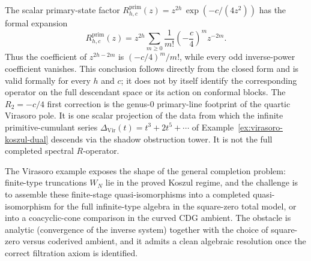 \begin{remark}
\label{rem:virasoro-r-matrix-paths}
The scalar primary-state factor
$R^{\mathrm{prim}}_{h,c}(z)=z^{2h}\,\exp(-c/(4z^{2}))$
has the formal expansion
\[
 R^{\mathrm{prim}}_{h,c}(z)
 =z^{2h}\sum_{m\geq 0}\frac{1}{m!}
 \left(-\frac{c}{4}\right)^m z^{-2m}.
\]
Thus the coefficient of $z^{2h-2m}$ is
$(-c/4)^m/m!$, while every odd inverse-power coefficient vanishes.
This conclusion follows directly from the closed form and is valid
formally for every $h$ and $c$; it does not by itself identify the
corresponding operator on the full descendant space or its action on
conformal blocks.
The $R_{2} = -c/4$ first correction is the genus-$0$
primary-line footprint of the quartic Virasoro pole. It is one scalar
projection of the data from which the infinite primitive-cumulant series
$\Delta_{\mathrm{Vir}}(t) = t^{3} + 2t^{5} + \cdots$ of
Example~\ref{ex:virasoro-koszul-dual} descends via the shadow
obstruction tower. It is not the full completed spectral
$R$-operator.
\end{remark}

The Virasoro example exposes the shape of the general completion
problem: finite-type truncations $W_N$ lie in the proved Koszul
regime, and the challenge is to assemble these finite-stage
quasi-isomorphisms into a completed quasi-isomorphism for the full
infinite-type algebra in the square-zero total model, or into a
coacyclic-cone comparison in the curved CDG ambient. The obstacle is
analytic (convergence of the inverse system) together with the choice
of square-zero versus coderived ambient, and it admits a clean
algebraic resolution once the correct filtration axiom is identified.

